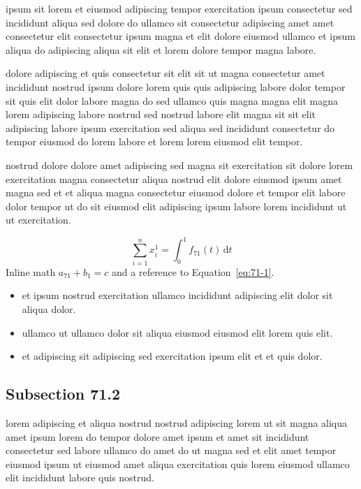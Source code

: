 \documentclass{article}
\begin{document}
ipsum sit lorem et eiusmod adipiscing tempor exercitation ipsum consectetur sed incididunt aliqua sed dolore do ullamco sit consectetur adipiscing amet amet consectetur elit consectetur ipsum magna et elit dolore eiusmod ullamco et ipsum aliqua do adipiscing aliqua sit elit et lorem dolore tempor magna labore.

dolore adipiscing et quis consectetur sit elit sit ut magna consectetur amet incididunt nostrud ipsum dolore lorem quis quis adipiscing labore dolor tempor sit quis elit dolor labore magna do sed ullamco quis magna magna elit magna lorem adipiscing labore nostrud sed nostrud labore elit magna sit sit elit adipiscing labore ipsum exercitation sed aliqua sed incididunt consectetur do tempor eiusmod do lorem labore et lorem lorem eiusmod elit tempor.

nostrud dolore dolore amet adipiscing sed magna sit exercitation sit dolore lorem exercitation magna consectetur aliqua nostrud elit dolore eiusmod ipsum amet magna sed et et aliqua magna consectetur eiusmod dolore et tempor elit labore dolor tempor ut do sit eiusmod elit adipiscing ipsum labore lorem incididunt ut ut exercitation.

\begin{equation}\label{eq:71-1}
  \sum_{i=1}^{n} x_i^{1} = \int_0^1 f_{71}(t)\,\mathrm{d}t
\end{equation}
Inline math $a_{71} + b_{1} = c$ and a reference to Equation~\eqref{eq:71-1}.

\begin{itemize}
  \item et ipsum nostrud exercitation ullamco incididunt adipiscing elit dolor sit aliqua dolor.
  \item ullamco ut ullamco dolor sit aliqua eiusmod eiusmod elit lorem quis elit.
  \item et adipiscing sit adipiscing sed exercitation ipsum elit et et quis dolor.
\end{itemize}

\subsection{Subsection 71.2}\label{sec:71-2}
lorem adipiscing et aliqua nostrud nostrud adipiscing lorem ut sit magna aliqua amet ipsum lorem do tempor dolore amet ipsum et amet sit incididunt consectetur sed labore ullamco do amet do ut magna sed et elit amet tempor eiusmod ipsum ut eiusmod amet aliqua exercitation quis lorem eiusmod ullamco elit incididunt labore quis nostrud.
\end{document}
